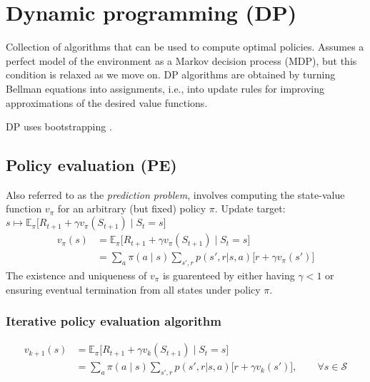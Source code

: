 \section{Dynamic programming (DP)}

Collection of algorithms that can be used to compute optimal policies.
Assumes a perfect model of the environment as a Markov decision process (MDP), but this condition is relaxed as we move on.
DP algorithms are obtained by turning Bellman equations into assignments, i.e., into update rules for improving approximations of the desired value functions.

DP uses bootstrapping .

\subsection{Policy evaluation (PE)}\label{sec:policy-evaluation}

Also referred to as the \textit{prediction problem}, involves computing the state-value function \( v_\pi \) for an arbitrary (but fixed) policy \( \pi \).
Update target: \( s \mapsto \mathbb{E}_{\pi} \big[ R_{t+1} + \gamma v_\pi(S_{t+1}) \;\big|\; S_t = s \big] \)
\begin{equation}
    \begin{aligned}
        v_\pi(s)
         & =
        \mathbb{E}_{\pi} \big[ R_{t+1} + \gamma v_\pi(S_{t+1}) \;\big|\; S_t = s \big]
        \\ & =
        \sum_{a} \pi(a \mid s) \sum_{s', r} p(s', r | s, a) \Big[ r + \gamma v_\pi(s') \Big]
    \end{aligned}
\end{equation}
The existence and uniqueness of \( v_\pi \) is guarenteed by either having \( \gamma < 1 \) or ensuring eventual termination from all states under policy \( \pi \).

\subsubsection{Iterative policy evaluation algorithm}\label{sec:iterative-policy-evaluation}

\begin{equation}
    \begin{aligned}
        v_{k+1}(s)
         & =
        \mathbb{E}_{\pi} \big[ R_{t+1} + \gamma v_k(S_{t+1}) \;\big|\; S_t = s \big]
        \\ & =
        \sum_{a} \pi(a \mid s) \sum_{s', r} p(s', r | s, a) \Big[ r + \gamma v_k(s') \Big]
        , \qquad \forall s \in \mathcal{S}
    \end{aligned}
\end{equation}

